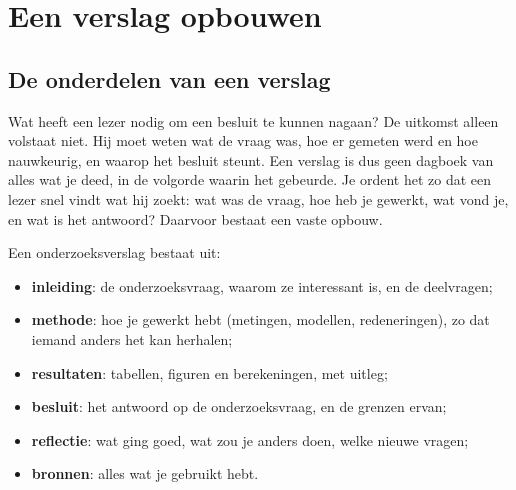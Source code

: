 \section{Een verslag opbouwen}

\subsection{De onderdelen van een verslag}

Wat heeft een lezer nodig om een besluit te kunnen nagaan? De uitkomst alleen volstaat niet. Hij moet weten wat de vraag was, hoe er gemeten werd en hoe nauwkeurig, en waarop het besluit steunt. Een verslag is dus geen dagboek van alles wat je deed, in de volgorde waarin het gebeurde. Je ordent het zo dat een lezer snel vindt wat hij zoekt: wat was de vraag, hoe heb je gewerkt, wat vond je, en wat is het antwoord? Daarvoor bestaat een vaste opbouw.

\begin{theorie}
Een onderzoeksverslag bestaat uit:
\begin{itemize}
\item \textbf{\textcolor{accent}{inleiding}}: de onderzoeksvraag, waarom ze interessant is, en de deelvragen;
\item \textbf{\textcolor{accent}{methode}}: hoe je gewerkt hebt (metingen, modellen, redeneringen), zo dat iemand anders het kan herhalen;
\item \textbf{\textcolor{accent}{resultaten}}: tabellen, figuren en berekeningen, met uitleg;
\item \textbf{\textcolor{accent}{besluit}}: het antwoord op de onderzoeksvraag, en de grenzen ervan;
\item \textbf{\textcolor{accent}{reflectie}}: wat ging goed, wat zou je anders doen, welke nieuwe vragen;
\item \textbf{\textcolor{accent}{bronnen}}: alles wat je gebruikt hebt.
\end{itemize}
\end{theorie}

